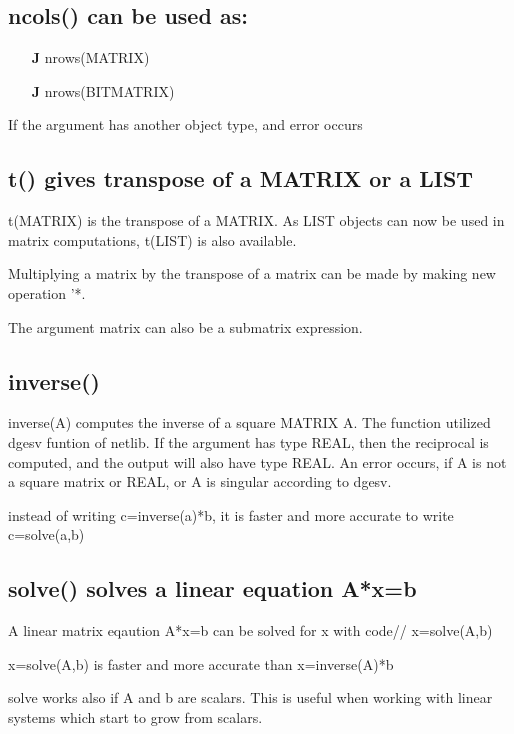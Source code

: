 \subsection{\textcolor{VioletRed}{ncols}() can be used as:}
\label{ncols}
\begin{itemize}
\item[\textbf{J}\.] \textcolor{VioletRed}{nrows}(MATRIX)
\item[\textbf{J}\.] \textcolor{VioletRed}{nrows}(BITMATRIX)
\end{itemize}
\begin{note}
If the argument has another object type, and error occurs
\end{note}
\subsection{\textcolor{VioletRed}{t}() gives transpose of a MATRIX or a LIST}
\label{t}
\textcolor{VioletRed}{t}(MATRIX) is the transpose of a MATRIX. As LIST objects can now
be used in matrix computations, \textcolor{VioletRed}{t}(LIST) is also available.
\begin{note}
Multiplying a matrix by the transpose of a matrix can be made by
making new operation '*.
\end{note}
\begin{note}
The argument matrix can also be a submatrix expression.
\end{note}
\subsection{\textcolor{VioletRed}{inverse}()}
\label{inverse}
\textcolor{VioletRed}{inverse}(A) computes the inverse of a square MATRIX A. The function utilized dgesv funtion
of netlib. If the argument has type REAL, then the reciprocal is computed,
and the output will also have type REAL. An error occurs, if A is not
a square matrix or REAL, or A is singular according to dgesv.
\begin{note}
instead of writing c=\textcolor{VioletRed}{inverse}(a)*b, it is faster and more accurate to
write c=\textcolor{VioletRed}{solve}(a,b)
\end{note}
\subsection{\textcolor{VioletRed}{solve}() solves a linear equation A*x=b}
\label{solve}
A linear matrix eqaution A*x=b can be solved for x with code//
x=\textcolor{VioletRed}{solve}(A,b)
\begin{note}
x=\textcolor{VioletRed}{solve}(A,b) is faster and more accurate than x=\textcolor{VioletRed}{inverse}(A)*b
\end{note}
\begin{note}
solve works also if A and b are scalars. This is useful when
working with linear systems which start to grow from scalars.
\end{note}
